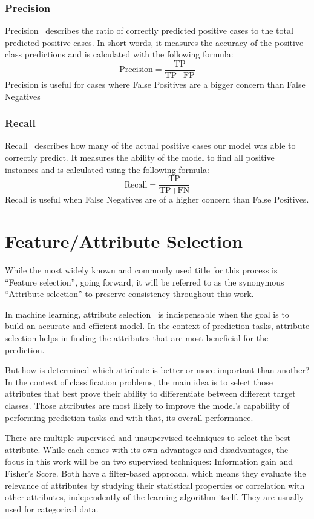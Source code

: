 \subsubsection{Precision}
Precision~\cite{evaluation_metrics} describes the ratio of correctly predicted positive cases to the total predicted positive cases. In short words, it measures the accuracy of the positive class predictions and is calculated with the following formula:
\[ \text{Precision} = \frac{\text{TP}}{\text{TP} + \text{FP}} \]
Precision is useful for cases where False Positives are a bigger concern than False Negatives

\subsubsection{Recall}
Recall~\cite{evaluation_metrics} describes how many of the actual positive cases our model was able to correctly predict. It measures the ability of the model to find all positive instances and is calculated using the following formula:
\[ \text{Recall} = \frac{\text{TP}}{\text{TP} + \text{FN}} \]
Recall is useful when False Negatives are of a higher concern than False Positives.

\section{Feature/Attribute Selection}
While the most widely known and commonly used title for this process is ``Feature selection'', going forward, it will be referred to as the synonymous ``Attribute selection'' to preserve consistency throughout this work.

In machine learning, attribute selection~\cite{feature_selection} is indispensable when the goal is to build an accurate and efficient model. In the context of prediction tasks, attribute selection helps in finding the attributes that are most beneficial for the prediction. 

But how is determined which attribute is better or more important than another? In the context of classification problems, the main idea is to select those attributes that best prove their ability to differentiate between different target classes. Those attributes are most likely to improve the model's capability of performing prediction tasks and with that, its overall performance.

There are multiple supervised and unsupervised techniques to select the best attribute. While each comes with its own advantages and disadvantages, the focus in this work will be on two supervised techniques: Information gain and Fisher's Score. Both have a filter-based approach, which means they evaluate the relevance of attributes by studying their statistical properties or correlation with other attributes, independently of the learning algorithm itself. They are usually used for categorical data.

